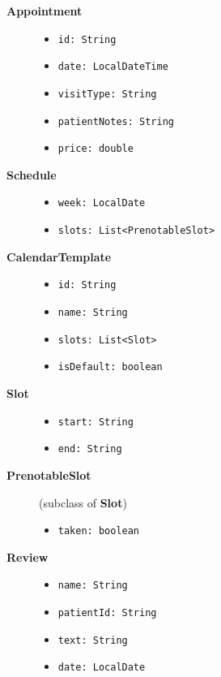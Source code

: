 \begin{description}
	\item[\textbf{Appointment}]
	\hfill
	\begin{itemize}
		\item \texttt{id: String}  
		\item \texttt{date: LocalDateTime}  
		\item \texttt{visitType: String}  
		\item \texttt{patientNotes: String}  
		\item \texttt{price: double}  
	\end{itemize}
	
	\item[\textbf{Schedule}]
	\hfill
	\begin{itemize}
		\item \texttt{week: LocalDate}  
		\item \texttt{slots: List<PrenotableSlot>}  
	\end{itemize}

	\item[\textbf{CalendarTemplate}]
	\hfill
	\begin{itemize}
		\item \texttt{id: String}  
		\item \texttt{name: String}  
		\item \texttt{slots: List<Slot>}  
		\item \texttt{isDefault: boolean}  
	\end{itemize}
	
	\item[\textbf{Slot}]
	\hfill
	\begin{itemize}
		\item \texttt{start: String}  
		\item \texttt{end: String}  
	\end{itemize}
	
	\item[\textbf{PrenotableSlot}] (subclass of \textbf{Slot})
	\hfill
	\begin{itemize}
		\item \texttt{taken: boolean}  
	\end{itemize}
	
	\item[\textbf{Review}]
	\hfill
	\begin{itemize}
		\item \texttt{name: String}  
		\item \texttt{patientId: String}  
		\item \texttt{text: String}  
		\item \texttt{date: LocalDate}  
	\end{itemize}
	

\end{description}
